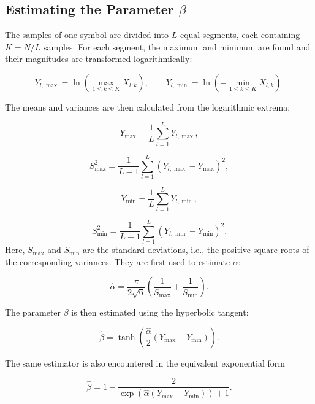 \documentclass[a4paper, 12pt, openany]{book}
\begin{document}
\subsection{Estimating the Parameter $\beta$}
\begin{tcolorbox}[breakable,colback=blue!5!white,colframe=blue!50!black,
title=Procedure 2: Estimating the parameter $\beta$]
\label{met:beta_estimator}
The samples of one symbol are divided into $L$ equal segments, each containing $K=N/L$ samples. For each segment, the maximum and minimum are found and their magnitudes are transformed logarithmically:

\begin{equation}
Y_{l,\max}=\ln\!\left(\max_{1\leq k\leq K} X_{l,k}\right),
\qquad
Y_{l,\min}=\ln\!\left(-\min_{1\leq k\leq K} X_{l,k}\right).
\end{equation}

The means and variances are then calculated from the logarithmic extrema:

\begin{equation}
Y_{\max}=\frac{1}{L}\sum_{l=1}^{L}Y_{l,\max},
\end{equation}

\begin{equation}
S^2_{\max}=\frac{1}{L-1}\sum_{l=1}^{L}(Y_{l,\max}-Y_{\max})^2,
\end{equation}

\begin{equation}
Y_{\min}=\frac{1}{L}\sum_{l=1}^{L}Y_{l,\min},
\end{equation}

\begin{equation}
S^2_{\min}=\frac{1}{L-1}\sum_{l=1}^{L}(Y_{l,\min}-Y_{\min})^2.
\end{equation}
Here, $S_{\max}$ and $S_{\min}$ are the standard deviations, i.e., the positive square roots of the corresponding variances. They are first used to estimate $\alpha$:

\begin{equation}
\hat{\alpha}
=
\frac{\pi}{2\sqrt{6}}
\left(
\frac{1}{S_{\max}}
+
\frac{1}{S_{\min}}
\right).
\end{equation}

The parameter $\beta$ is then estimated using the hyperbolic tangent:

\begin{equation}
\hat{\beta}
=
\tanh\!\left(
\frac{\hat{\alpha}}{2}
(Y_{\max}-Y_{\min})
\right).
\end{equation}

The same estimator is also encountered in the equivalent exponential form

\begin{equation}
\hat{\beta}
=
1-
\frac{2}
{\exp\!\left(\hat{\alpha}(Y_{\max}-Y_{\min})\right)+1}.
\end{equation}
\end{tcolorbox}
\end{document}
